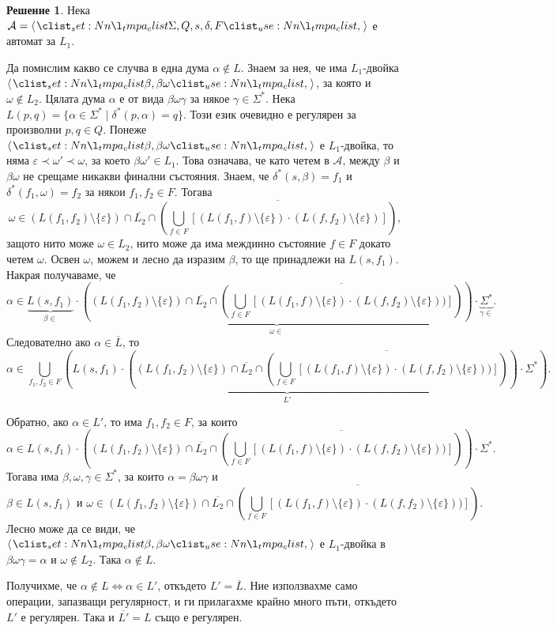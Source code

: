 \documentclass{article}
\theoremstyle{definition}
\newtheorem*{solution}{Решение}
\begin{document}
\begin{solution}
    Нека $\mathcal{A} = \opair{\Sigma, Q, s, \delta, F}$ е автомат за $L_1$.

    Да помислим какво се случва в една дума $\alpha \notin L$.
    Знаем за нея, че има $L_1$-двойка $\opair{\beta, \beta \omega}$, за която и $\omega \notin L_2$.
    Цялата дума $\alpha$ е от вида $\beta \omega \gamma$ за някое $\gamma \in \Sigma^*$.
    Нека $L(p, q) = \{ \alpha \in \Sigma^* \mid \delta^*(p, \alpha) = q \}$.
    Този език очевидно е регулярен за произволни $p, q \in Q$.
    Понеже $\opair{\beta, \beta \omega}$ е $L_1$-двойка, то няма $\varepsilon \prec \omega' \prec \omega$, за което $\beta \omega' \in L_1$.
    Това означава, че като четем в $\mathcal{A}$, между $\beta$ и $\beta \omega$ не срещаме никакви финални състояния.
    Знаем, че $\delta^*(s, \beta) = f_1$ и $\delta^*(f_1, \omega) = f_2$ за някои $f_1, f_2 \in F$.
    Тогава
    \[
        \omega \in (L(f_1, f_2) \setminus \{ \varepsilon \}) \cap \overline{L_2} \cap \overline{\left(\bigcup\limits_{f \in F}[(L(f_1, f) \setminus \{ \varepsilon \}) \cdot (L(f, f_2) \setminus \{ \varepsilon \})]\right)},
    \]
    защото нито може $\omega \in L_2$, нито може да има междинно състояние $f \in F$ докато четем $\omega$.
    Освен $\omega$, можем и лесно да изразим $\beta$, то ще принадлежи на $L(s, f_1)$.
    Накрая получаваме, че
    \[
        \alpha \in \underbrace{L(s, f_1)}_{\beta \in} \cdot \underbrace{\left((L(f_1, f_2) \setminus \{ \varepsilon \}) \cap \overline{L_2} \cap \overline{\left(\bigcup\limits_{f \in F}[(L(f_1, f) \setminus \{ \varepsilon \}) \cdot (L(f, f_2) \setminus \{ \varepsilon \}))]\right)}\right)}_{\omega \in} \cdot \underbrace{\Sigma^*}_{\gamma \in}.
    \]
    Следователно ако $\alpha \in \overline{L}$, то
    \[
        \alpha \in \underbrace{\bigcup\limits_{f_1, f_2 \in F}\left(L(s, f_1) \cdot \left((L(f_1, f_2) \setminus \{ \varepsilon \}) \cap \overline{L_2} \cap \overline{\left(\bigcup\limits_{f \in F}[(L(f_1, f) \setminus \{ \varepsilon \}) \cdot (L(f, f_2) \setminus \{ \varepsilon \}))]\right)}\right) \cdot \Sigma^*\right)}_{L'}.
    \]

    Обратно, ако $\alpha \in L'$, то има $f_1, f_2 \in F$, за които
    \[
        \alpha \in L(s, f_1) \cdot \left((L(f_1, f_2) \setminus \{ \varepsilon \}) \cap \overline{L_2} \cap \overline{\left(\bigcup\limits_{f \in F}[(L(f_1, f) \setminus \{ \varepsilon \}) \cdot (L(f, f_2) \setminus \{ \varepsilon \}))]\right)}\right) \cdot \Sigma^*.
    \]
    Тогава има $\beta, \omega, \gamma \in \Sigma^*$, за които $\alpha = \beta \omega \gamma$ и
    \[
        \beta \in L(s, f_1) \text{ и } \omega \in (L(f_1, f_2) \setminus \{ \varepsilon \}) \cap \overline{L_2} \cap \overline{\left(\bigcup\limits_{f \in F}[(L(f_1, f) \setminus \{ \varepsilon \}) \cdot (L(f, f_2) \setminus \{ \varepsilon \}))]\right)}.
    \]
    Лесно може да се види, че $\opair{\beta, \beta \omega}$ е $L_1$-двойка в $\beta \omega \gamma = \alpha$ и $\omega \notin L_2$.
    Така $\alpha \notin L$.

    Получихме, че $\alpha \notin L \iff \alpha \in L'$, откъдето $L' = \overline{L}$.
    Ние използвахме само операции, запазващи регулярност, и ги прилагахме крайно много пъти, откъдето $L'$ е регулярен.
    Така и $\overline{L'} = L$ също е регулярен.
\end{solution}
\end{document}
